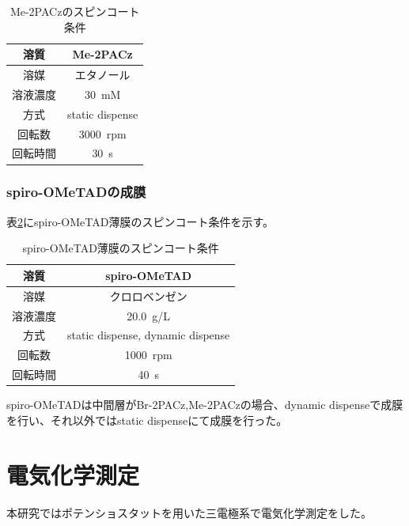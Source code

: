   \begin{table}[H] 
	  \centering 
	  \caption{Me-2PACzのスピンコート条件} 
	  \label{Meの成膜条件} 
	  \begin{tabular}{cc} 
	  \hline 
	  溶質&Me-2PACz\\\hline 
	  溶媒&エタノール\\\hline 
	  溶液濃度&\SI{30}{mM}\\\hline 
      方式&static dispense\\\hline
	  回転数&\SI{3000}{rpm}\\\hline 
	  回転時間&\SI{30}{s}\\\hline 
  \end{tabular} 
  \end{table}

  \subsubsection{spiro-OMeTADの成膜}
表\ref{spiro-OMeTADの成膜条件}にspiro-OMeTAD薄膜のスピンコート条件を示す。

\begin{table}[H]
		 \centering 
		 \caption{spiro-OMeTAD薄膜のスピンコート条件}
		  \label{spiro-OMeTADの成膜条件} \begin{tabular}{cc} 
		  \hline 
		  溶質&spiro-OMeTAD\\\hline 
		  溶媒&クロロベンゼン\\\hline 
		  溶液濃度&\SI{20.0}{g/L}\\\hline 
          方式&static dispense, dynamic dispense\\\hline
		  回転数&\SI{1000}{rpm}\\\hline 
		  回転時間&\SI{40}{s}\\ \hline 
	\end{tabular} 
 \end{table} 
spiro-OMeTADは中間層がBr-2PACz,Me-2PACzの場合、dynamic dispenseで成膜を行い、それ以外ではstatic dispenseにて成膜を行った。 	

\section{電気化学測定}
本研究ではポテンショスタットを用いた三電極系で電気化学測定をした。

